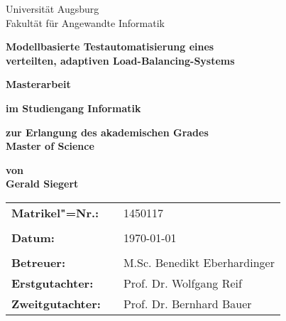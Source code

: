 \begin{center}
    {\Large{Universität Augsburg\\Fakultät für Angewandte Informatik}}
    \vspace{4\baselineskip}
    
    \begin{onehalfspace}
        \textbf{\large{Modellbasierte Testautomatisierung eines\\verteilten, adaptiven Load-Balancing-Systems}}
    \end{onehalfspace}
    \vspace{3\baselineskip}
    
    \textbf{{\Large{Masterarbeit}}}
    \vspace{1\baselineskip}
    
    \textbf{im Studiengang Informatik}
    \vspace{1\baselineskip}
    
    \textbf{zur Erlangung des akademischen Grades\\Master of Science}
    \vspace{1\baselineskip}
    
    \textbf{von\\Gerald Siegert}
    \vspace{\fill}
    
    \begin{singlespace}
        \begin{tabular}{lll}
        	\textbf{Matrikel"=Nr.:}       &  & 1450117                      \\
        	                         &  &                              \\
        	\textbf{Datum:}          &  & \today                       \\
        	                         &  &                              \\
        	\textbf{Betreuer:}       &  & M.Sc. Benedikt Eberhardinger \\
        	\textbf{Erstgutachter:}  &  & Prof. Dr. Wolfgang Reif      \\
        	\textbf{Zweitgutachter:} &  & Prof. Dr. Bernhard Bauer
        \end{tabular}
    \end{singlespace}
\end{center}
